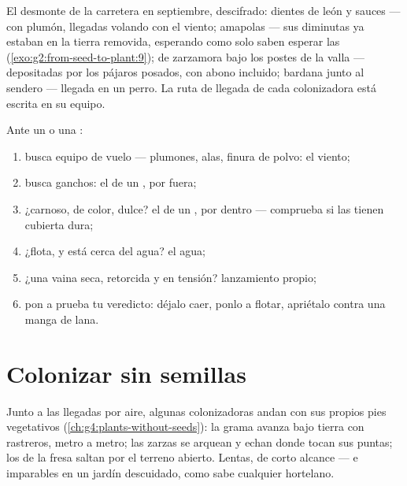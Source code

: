 \begin{example}\label{ex:g6:how-plants-spread:roadside}
El desmonte de la carretera en septiembre, descifrado: dientes de león
y sauces ---  con plumón, llegadas volando con el viento;
amapolas --- sus  diminutas ya estaban en la tierra removida,
esperando como solo saben esperar las 
(\cref{exo:g2:from-seed-to-plant:9});  de zarzamora bajo los
postes de la valla --- depositadas por los pájaros posados, con abono
incluido; bardana junto al sendero --- llegada en un perro. La ruta de
llegada de cada colonizadora está escrita en su equipo.
\end{example}

\begin{method}\label{met:g6:how-plants-spread:name}
Ante un  o una :
\begin{enumerate}
  \item busca equipo de vuelo --- plumones, alas, finura de polvo: el
        viento;
  \item busca ganchos: el  de un , por fuera;
  \item ¿carnoso, de color, dulce? el  de un , por
        dentro --- comprueba si las  tienen cubierta dura;
  \item ¿flota, y está cerca del agua? el agua;
  \item ¿una vaina seca, retorcida y en tensión? lanzamiento propio;
  \item pon a prueba tu veredicto: déjalo caer, ponlo a flotar,
        apriétalo contra una manga de lana.
\end{enumerate}
\end{method}

\section{Colonizar sin semillas}

\begin{example}\label{ex:g6:how-plants-spread:vegetative}
Junto a las llegadas por aire, algunas colonizadoras andan con sus
propios pies vegetativos (\cref{ch:g4:plants-without-seeds}): la grama
avanza bajo tierra con  rastreros, metro a metro; las zarzas se
arquean y echan  donde tocan sus puntas; los  de la
fresa saltan por el terreno abierto. Lentas, de corto alcance --- e
imparables en un jardín descuidado, como sabe cualquier hortelano.
\end{example}

